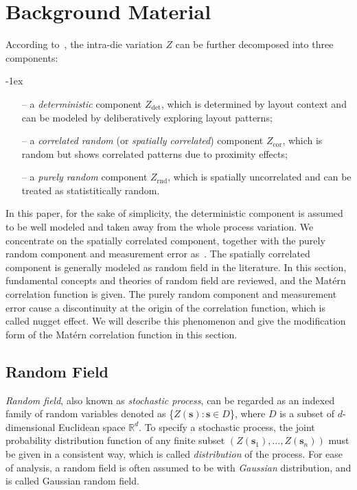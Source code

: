 \documentclass[referee]{ieice}
\begin{document}
\section{Background Material}
According to~\cite{Pitchumani05}, the intra-die variation $Z$ can be further decomposed into
three components: {\parskip -1ex
\begin{itemize}
\item[--] a {\it deterministic} component $Z_\mathrm{det}$, which is determined by layout context and can be modeled
by deliberatively exploring layout patterns;
\item[--] a {\it correlated random} (or {\it spatially correlated}) component $Z_\mathrm{cor}$,
which is random but shows correlated patterns due to proximity effects;
\item[--] a {\it purely random} component $Z_\mathrm{rnd}$, which is spatially uncorrelated and
can be treated as statistitically random.
\end{itemize}
}

In this paper, for the sake of simplicity, the deterministic
component is assumed to be well modeled and taken away from the
whole process variation. We concentrate on the spatially correlated
component, together with the purely random component and measurement error as~\cite{Xiong07,Fu08}.
The spatially correlated component is generally modeled as random field in the literature.
In this section, fundamental concepts and theories of random field are reviewed, and
the Mat\'{e}rn correlation function is given. The purely random component and
measurement error cause a discontinuity at the origin of the correlation function, which is called nugget effect.
We will describe this phenomenon and give the modification form of the Mat\'{e}rn correlation function
in this section.

\subsection{Random Field~\cite{Schabenberger05}}
{\it Random field}, also known as {\it stochastic process}, can be regarded as an indexed family of random variables
denoted as \{$Z(\mathbf{s}): \mathbf{s}\in D$\}, where $D$ is a subset of $d$-dimensional Euclidean space
$\mathbb{R}^d$. To specify a stochastic process, the joint probability distribution function of any finite subset
$(Z(\mathbf{s}_1), \ldots, Z(\mathbf{s}_n))$ must be given in a consistent way, which is called {\it distribution} of
the process. For ease of analysis, a random field is often assumed to be with {\it Gaussian}
distribution, and is called Gaussian random field.
\end{document}
